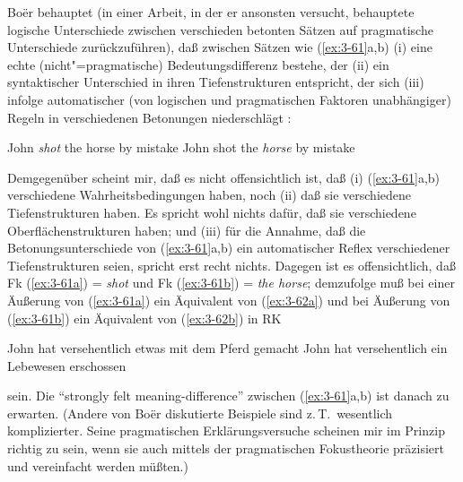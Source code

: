 \documentclass[output=paper]{langsci/langscibook}
\begin{document}
Bo{\"e}r behauptet (in einer Arbeit, in der er ansonsten versucht,
behauptete logische Unterschiede zwischen verschieden betonten Sätzen
auf pragmatische Unterschiede zurückzuführen), daß zwischen Sätzen
wie (\ref{ex:3-61}a,b) (i) eine echte (nicht"=pragmatische) Bedeutungsdifferenz
bestehe, der (ii) ein syntaktischer Unterschied in ihren Tiefenstrukturen entspricht, der sich (iii) infolge automatischer (von logischen und pragmatischen Faktoren unabhängiger) Regeln in
verschiedenen Betonungen niederschlägt \citep[276]{Boer79}:
\begin{exe}
\ex
\label{ex:3-61}
\begin{xlist}
\ex
\label{ex:3-61a}
John \textit{shot} the horse by mistake
\ex
\label{ex:3-61b}
John shot the \textit{horse} by mistake
\end{xlist}
\end{exe}
Demgegenüber scheint mir, daß es nicht offensichtlich ist, daß (i) (\ref{ex:3-61}a,b) verschiedene Wahrheitsbedingungen haben, noch (ii) daß sie
verschiedene Tiefenstrukturen haben. Es spricht wohl nichts dafür, daß
sie verschiedene Oberflächenstrukturen haben; und (iii) für die
Annahme, daß die Betonungsunterschiede von (\ref{ex:3-61}a,b) ein automatischer Reflex verschiedener Tiefenstrukturen seien, spricht erst recht
nichts. Dagegen ist es offensichtlich, daß Fk (\ref{ex:3-61a}) = \textit{shot} und Fk
(\ref{ex:3-61b}) = \textit{the horse}; demzufolge muß bei einer Äußerung von (\ref{ex:3-61a}) ein Äquivalent von (\ref{ex:3-62a}) und bei Äußerung von (\ref{ex:3-61b}) ein Äquivalent von (\ref{ex:3-62b}) in RK
\begin{exe}
\ex
\label{ex:3-62}
\begin{xlist}
\ex
\label{ex:3-62a}
John hat versehentlich etwas mit dem Pferd gemacht
\ex
\label{ex:3-62b}
John hat versehentlich ein Lebewesen erschossen
\end{xlist}
\end{exe}
sein. Die "`strongly felt meaning-difference"' \citep[275]{Boer79}
zwischen (\ref{ex:3-61}a,b) ist danach zu erwarten. (Andere von Bo{\"e}r diskutierte Beispiele sind z.\,T.\ wesentlich komplizierter. Seine pragmatischen Erklärungsversuche scheinen mir im Prinzip richtig zu sein, wenn sie auch mittels der pragmatischen Fokustheorie präzisiert und vereinfacht werden müßten.)
\end{document}
